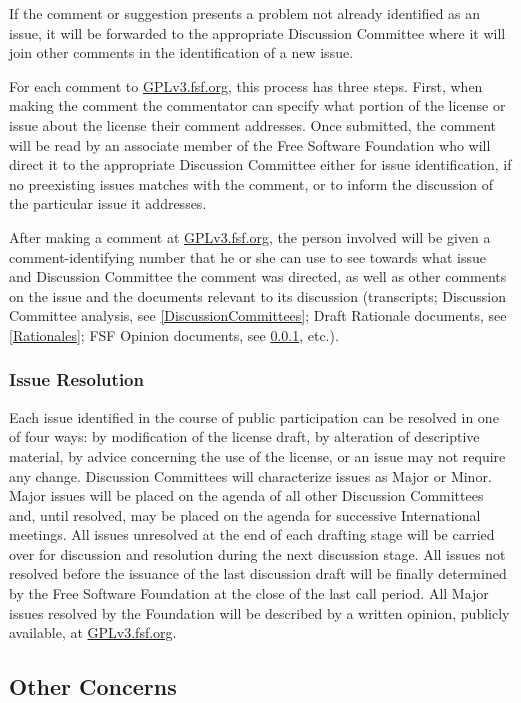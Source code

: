\documentclass[a4paper,spanish,12pt]{book}
\begin{document}
If the comment or suggestion presents a problem not already identified
as an issue, it will be forwarded to the appropriate Discussion
Committee where it will join other comments in the identification of a
new issue.

For each comment to \url{GPLv3.fsf.org}, this process has three
steps.  First, when making the comment the commentator can specify
what portion of the license or issue about the license their comment
addresses.  Once submitted, the comment will be read by an associate
member of the Free Software Foundation who will direct it to the
appropriate Discussion Committee either for issue identification, if
no preexisting issues matches with the comment, or to inform the
discussion of the particular issue it addresses.

After making a comment at \url{GPLv3.fsf.org}, the person involved
will be given a comment-identifying number that he or she can use to
see towards what issue and Discussion Committee the comment was
directed, as well as other comments on the issue and the documents
relevant to its discussion (transcripts; Discussion Committee
analysis, see \ref{DiscussionCommittees}; Draft Rationale documents,
see \ref{Rationales}; FSF Opinion documents, see
\ref{issueresolution}, etc.).

\subsubsection{Issue Resolution}\label{issueresolution} Each issue
identified in the course of public participation can be resolved in
one of four ways: by modification of the license draft, by alteration
of descriptive material, by advice concerning the use of the license,
or an issue may not require any change.  Discussion Committees will
characterize issues as Major or Minor.  Major issues will be placed on
the agenda of all other Discussion Committees and, until resolved, may
be placed on the agenda for successive International meetings.  All
issues unresolved at the end of each drafting stage will be carried
over for discussion and resolution during the next discussion stage.
All issues not resolved before the issuance of the last discussion
draft will be finally determined by the Free Software Foundation at
the close of the last call period.  All Major issues resolved by the
Foundation will be described by a written opinion, publicly available,
at \url{GPLv3.fsf.org}.


\subsection{Other Concerns}
\end{document}
